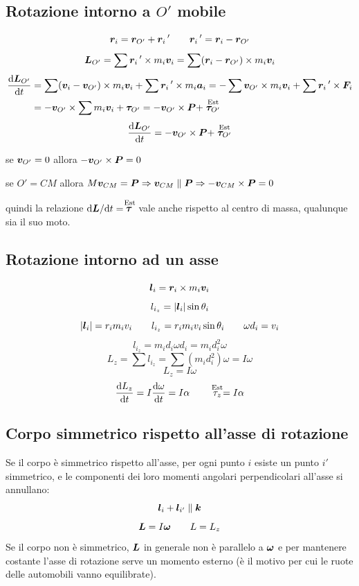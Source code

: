 \subsection{Rotazione intorno a \texorpdfstring{$O'$}{O'} mobile}
\[\boldsymbol{r}_i=\boldsymbol{r}_{O'}+\boldsymbol{r}_i\,'\qquad \boldsymbol{r}_i\,'=\boldsymbol{r}_i-\boldsymbol{r}_{O'}\]
\[\boldsymbol{L}_{O'}=\sum\boldsymbol{r}_i\,'\times m_i\boldsymbol{v}_i=\sum(\boldsymbol{r}_i-\boldsymbol{r}_{O'})\times m_i\boldsymbol{v}_i\]
\begin{align*}
  \frac{\mathrm{d} \boldsymbol{L}_{O'}}{\mathrm{d} t} & =\sum(\boldsymbol{v}_i-\boldsymbol{v}_{O'})\times m_i\boldsymbol{v}_i+\sum\boldsymbol{r}_i\,'\times m_i\boldsymbol{a}_i=-\sum\boldsymbol{v}_{O'}\times m_i\boldsymbol{v}_i+\sum\boldsymbol{r}_i\,'\times\boldsymbol{F}_i \\
                           & =-\boldsymbol{v}_{O'}\times\sum m_i\boldsymbol{v}_i+\boldsymbol{\tau}_{O'}=-\boldsymbol{v}_{O'}\times\boldsymbol{P}+\stackrel{\text{Est}}{\boldsymbol{\tau}_{O'}}
\end{align*}
\[\frac{\mathrm{d} \boldsymbol{L}_{O'}}{\mathrm{d} t}=-\boldsymbol{v}_{O'}\times\boldsymbol{P}+\stackrel{\text{Est}}{\boldsymbol{\tau}_{O'}}\]

se $\boldsymbol{v}_{O'}=0$ allora $-\boldsymbol{v}_{O'}\times\boldsymbol{P}=0$

se $O'=CM$ allora $M\boldsymbol{v}_{CM}=\boldsymbol{P}\Rightarrow\boldsymbol{v}_{CM}\parallel\boldsymbol{P}\Rightarrow -\boldsymbol{v}_{CM}\times\boldsymbol{P}=0$

quindi la relazione $\mathrm{d}\boldsymbol{L}/\mathrm{d} t=\stackrel{\text{Est}}{\boldsymbol{\tau}}$ vale anche rispetto al centro di massa, qualunque sia il suo moto.

\subsection{Rotazione intorno ad un asse}
\[\boldsymbol{l}_i=\boldsymbol{r}_i\times m_i\boldsymbol{v}_i\]
\[l_{i_z}=|\boldsymbol{l}_i|\sin\theta_i\]
\[|\boldsymbol{l}_i|=r_im_iv_i\qquad l_{i_z}=r_im_iv_i\sin\theta_i\qquad
  \omega d_i=v_i\]
\[l_{i_z}=m_id_i\omega d_i=m_id_i^2\omega\]
\[L_z=\sum l_{i_z}=\sum(m_id_i^2)\omega=I\omega\]
\[L_z=I\omega\]
\[\frac{\mathrm{d} L_{z}}{\mathrm{d} t}=I\frac{\mathrm{d} \omega}{\mathrm{d}
    t}=I\alpha\qquad \stackrel{\text{Est}}{\tau_{z}}=I\alpha\]
\subsection{Corpo simmetrico rispetto all'asse di rotazione}
Se il corpo è simmetrico rispetto all'asse, per ogni punto $i$ esiste un punto $i'$ simmetrico, e le componenti dei loro momenti angolari perpendicolari all'asse si annullano:
\[\boldsymbol{l}_i+\boldsymbol{l}_{i'}\parallel\boldsymbol{k}\]
\[\boldsymbol{L}=I\boldsymbol{\omega}\qquad L=L_z\]
Se il corpo non è simmetrico, $\boldsymbol{L}$ in generale non è parallelo a $\boldsymbol{\omega}$ e per mantenere costante l'asse di rotazione serve un momento esterno (è il motivo per cui le ruote delle automobili vanno equilibrate).


